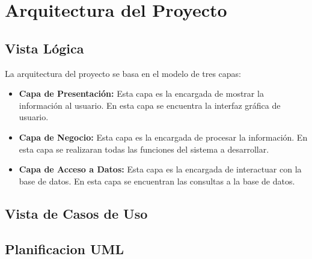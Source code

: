 \section*{Arquitectura del Proyecto}

\subsection*{Vista Lógica}
La arquitectura del proyecto se basa en el modelo de tres capas: 
\begin{itemize}
    \item \textbf{Capa de Presentación:} Esta capa es la encargada de mostrar la información al usuario. 
    En esta capa se encuentra la interfaz gráfica de usuario.
    \item \textbf{Capa de Negocio:} Esta capa es la encargada de procesar la información. 
    En esta capa se realizaran todas las funciones del sistema a desarrollar.
    \item \textbf{Capa de Acceso a Datos:} Esta capa es la encargada de interactuar con la base de datos. 
    En esta capa se encuentran las consultas a la base de datos.
\end{itemize}

\subsection*{Vista de Casos de Uso}



\subsection*{Planificacion UML}

